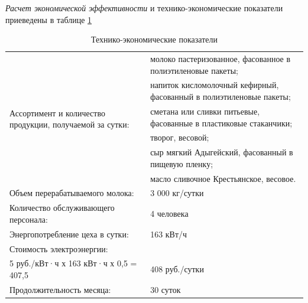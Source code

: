 \textit{Расчет экономической эффективности} и технико-экономические показатели приеведены в таблице \ref{my-label}

\begin{table}[]
	\small
	\centering
	\caption{Технико-экономические показатели}
	\label{my-label}
	\setlength{\extrarowheight}{0.7mm}
	\begin{tabularx}{\textwidth}{|p{8.05cm}|p{8.05cm}|}
		\hline
		\multirow{6}{8cm}{Ассортимент и количество продукции, получаемой за сутки:} & молоко пастеризованное, фасованное в полиэтиленовые пакеты;     \\ \cline{2-2} 
																				& напиток кисломолочный кефирный, фасованный в полиэтиленовые пакеты; \\ \cline{2-2} 
																				& сметана или сливки питьевые, фасованные в пластиковые стаканчики;   \\ \cline{2-2} 
																				& творог, весовой;                                                    \\ \cline{2-2} 
																				& сыр мягкий Адыгейский, фасованный в пищевую пленку;                 \\ \cline{2-2} 
																				& масло сливочное Крестьянское, весовое.                              \\ \hline
		Объем перерабатываемого молока:                                         & 3 000 кг/сутки                                                      \\ \hline
		Количество обслуживающего персонала:                                    & 4 человека                                                          \\ \hline
		Энергопотребление цеха в сутки:                                         & 163 кВт/ч                                                           \\ \hline
		\multicolumn{2}{|l|}{Стоимость электроэнергии:}                                                                                               \\ \hline
		5 руб./кВт·ч х 163 кВт·ч х 0,5 = 407,5                                  & 408 руб./сутки                                                      \\ \hline
		Продолжительность месяца:                                               & 30 суток                                                            \\ \hline

\end{tabularx}
\end{table}
